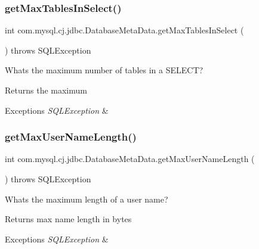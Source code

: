 \subsubsection{\texorpdfstring{get\+Max\+Tables\+In\+Select()}{getMaxTablesInSelect()}}
{\footnotesize\ttfamily int com.\+mysql.\+cj.\+jdbc.\+Database\+Meta\+Data.\+get\+Max\+Tables\+In\+Select (\begin{DoxyParamCaption}{ }\end{DoxyParamCaption}) throws S\+Q\+L\+Exception}

What\textquotesingle{}s the maximum number of tables in a S\+E\+L\+E\+CT?

\begin{DoxyReturn}{Returns}
the maximum 
\end{DoxyReturn}

\begin{DoxyExceptions}{Exceptions}
{\em S\+Q\+L\+Exception} & \\
\hline
\end{DoxyExceptions}
\mbox{\label{classcom_1_1mysql_1_1cj_1_1jdbc_1_1_database_meta_data_a1db300512ebbf0e6accd4b4b34aa886f}} 
\subsubsection{\texorpdfstring{get\+Max\+User\+Name\+Length()}{getMaxUserNameLength()}}
{\footnotesize\ttfamily int com.\+mysql.\+cj.\+jdbc.\+Database\+Meta\+Data.\+get\+Max\+User\+Name\+Length (\begin{DoxyParamCaption}{ }\end{DoxyParamCaption}) throws S\+Q\+L\+Exception}

What\textquotesingle{}s the maximum length of a user name?

\begin{DoxyReturn}{Returns}
max name length in bytes 
\end{DoxyReturn}

\begin{DoxyExceptions}{Exceptions}
{\em S\+Q\+L\+Exception} & \\
\hline
\end{DoxyExceptions}
\mbox{\label{classcom_1_1mysql_1_1cj_1_1jdbc_1_1_database_meta_data_ac051ffbe456985aca58313ed7215b91c}} 
